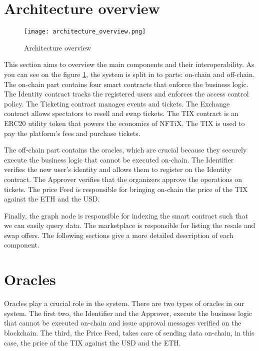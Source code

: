 \documentclass[a4paper,11pt,oneside]{report}
\begin{document}
\section{Architecture overview}

\begin{figure}[h!] 
  \centering
  \texttt{[image: architecture\_overview.png]}
  \caption{Architecture overview}
  \label{fig:architecture_overview}
\end{figure}

This section aims to overview the main components and their interoperability. As you can see on the figure \hyperref[fig:architecture_overview]{\ref{fig:architecture_overview}}, the system is split in to parts: on-chain and off-chain. The on-chain part contains four smart contracts that enforce the business logic. The Identity contract tracks the registered users and enforces the access control policy. The Ticketing contract manages events and tickets. The Exchange contract allows spectators to resell and swap tickets. The TIX contract is an ERC20 utility token that powers the economics of NFTiX. The TIX is used to pay the platform's fees and purchase tickets.

The off-chain part contains the oracles, which are crucial because they securely execute the business logic that cannot be executed on-chain. The Identifier verifies the new user's identity and allows them to register on the Identity contract. The Approver verifies that the organizers approve the operations on tickets. The price Feed is responsible for bringing on-chain the price of the TIX against the ETH and the USD.

Finally, the graph node is responsible for indexing the smart contract such that we can easily query data. The marketplace is responsible for listing the resale and swap offers. The following sections give a more detailed description of each component.

\section{Oracles}
Oracles play a crucial role in the system. There are two types of oracles in our system. The first two, the Identifier and the Approver, execute the business logic that cannot be executed on-chain and issue approval messages verified on the blockchain. The third, the Price Feed, takes care of sending data on-chain, in this case, the price of the TIX against the USD and the ETH.
\end{document}
